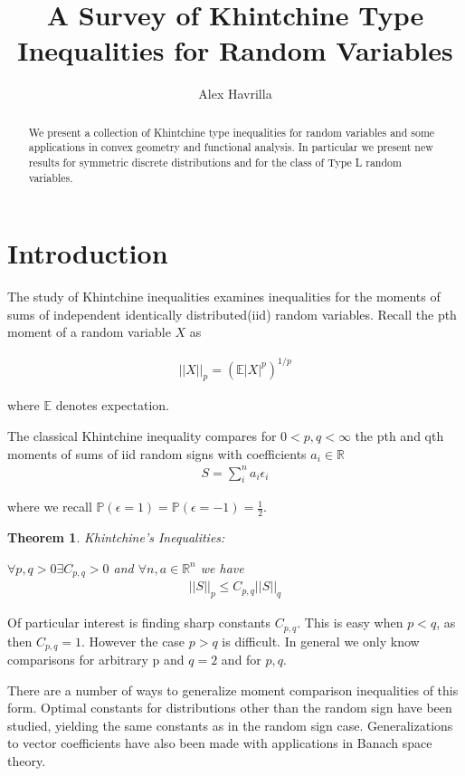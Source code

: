 \documentclass[10pt]{article}
\title{\vspace{-3em}A Survey of Khintchine Type Inequalities for Random Variables}
\author{Alex Havrilla}
\newcommand{\Pp}{\mathbb{P}}
\newcommand{\E}{\mathbb{E}}
\newcommand{\1}{\textbf{1}}
\newcommand{\R}{\mathbb{R}}
\newtheorem{theorem}{Theorem}
\theoremstyle{remark}
\theoremstyle{definition}
\begin{document}
\maketitle

\begin{abstract}
	We present a collection of Khintchine type inequalities for random variables and some applications in convex geometry and functional analysis. In particular we present new results for symmetric discrete distributions and for the class of Type L random variables.
\end{abstract}

\newpage

\section{Introduction}

The study of Khintchine inequalities examines inequalities for the moments of sums of independent identically distributed(iid) random variables. Recall the pth moment of a random variable $X$ as

\begin{align*}
	||X||_p = (\E|X|^p)^{1/p}
\end{align*}

where $\E$ denotes expectation.

The classical Khintchine inequality compares for $0 < p,q < \infty$ the pth and qth moments of sums of iid random signs with coefficients $a_i \in \R$
\begin{align*}
	S = \sum_i^n a_i \epsilon_i
\end{align*}

where we recall $\Pp(\epsilon = 1) = \Pp(\epsilon = -1) = \frac{1}{2}$. 

\begin{theorem}Khintchine's Inequalities:

	$\forall p,q > 0 \exists C_{p,q} > 0$ and $\forall n, a \in \R^n$ we have
	\begin{align*}
		||S||_p \leq C_{p,q} ||S||_q
	\end{align*}
\end{theorem}


Of particular interest is finding sharp constants $C_{p,q}$. This is easy when $p < q$, as then $C_{p,q} = 1$. However the case $p > q$ is difficult. In general we only know comparisons for arbitrary p and $q=2$ and for $p,q$. 

There are a number of ways to generalize moment comparison inequalities of this form. Optimal constants for distributions other than the random sign have been studied, yielding the same constants as in the random sign case. Generalizations to vector coefficients have also been made with applications in Banach space theory.
\end{document}
